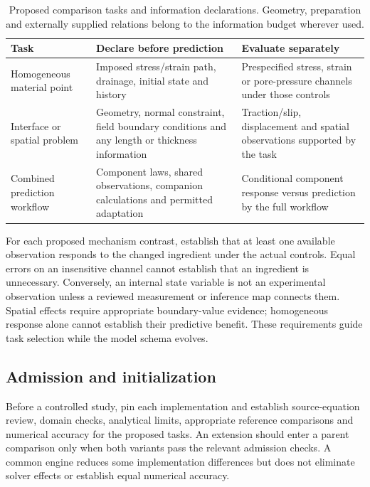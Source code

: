\documentclass[11pt,a4paper]{article}
\begin{document}
\begin{table}[htbp]
\centering\small
\caption{Proposed comparison tasks and information declarations. Geometry, preparation and externally supplied relations belong to the information budget wherever used.}
\label{tab:taskcontract}
\renewcommand{\arraystretch}{1.15}
\begin{tabular}{>{\raggedright\arraybackslash}p{.20\linewidth} >{\raggedright\arraybackslash}p{.34\linewidth} >{\raggedright\arraybackslash}p{.35\linewidth}}
\toprule
Task & Declare before prediction & Evaluate separately\\
\midrule
Homogeneous material point & Imposed stress/strain path, drainage, initial state and history & Prespecified stress, strain or pore-pressure channels under those controls\\
Interface or spatial problem & Geometry, normal constraint, field boundary conditions and any length or thickness information & Traction/slip, displacement and spatial observations supported by the task\\
Combined prediction workflow & Component laws, shared observations, companion calculations and permitted adaptation & Conditional component response versus prediction by the full workflow\\
\bottomrule
\end{tabular}
\end{table}

For each proposed mechanism contrast, establish that at least one available observation responds to the changed ingredient under the actual controls. Equal errors on an insensitive channel cannot establish that an ingredient is unnecessary. Conversely, an internal state variable is not an experimental observation unless a reviewed measurement or inference map connects them. Spatial effects require appropriate boundary-value evidence; homogeneous response alone cannot establish their predictive benefit. These requirements guide task selection while the model schema evolves.

\subsection{Admission and initialization}
Before a controlled study, pin each implementation and establish source-equation review, domain checks, analytical limits, appropriate reference comparisons and numerical accuracy for the proposed tasks. An extension should enter a parent comparison only when both variants pass the relevant admission checks. A common engine reduces some implementation differences but does not eliminate solver effects or establish equal numerical accuracy.
\end{document}
